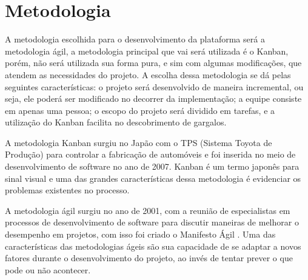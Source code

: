 \chapter[Metodologia]{Metodologia}
A metodologia escolhida para o desenvolvimento da plataforma será a metodologia ágil, a metodologia principal que vai será utilizada é o Kanban, porém, não será utilizada sua forma pura, e sim com algumas modificações, que atendem as necessidades do projeto. A escolha dessa metodologia se dá pelas seguintes características: o projeto será desenvolvido de maneira incremental, ou seja, ele poderá ser modificado no decorrer da implementação; a equipe consiste em apenas uma pessoa; o escopo do projeto será dividido em tarefas, e a utilização do Kanban facilita no descobrimento de gargalos.

A metodologia Kanban surgiu no Japão com o TPS (Sistema Toyota de Produção) \cite{tps} para controlar a fabricação de automóveis e foi inserida no meio de desenvolvimento de software no ano de 2007. Kanban é um termo japonês para sinal visual e uma das grandes características dessa metodologia é evidenciar os problemas existentes no processo. 

A metodologia ágil surgiu no ano de 2001, com a reunião de especialistas em processos de desenvolvimento de software para discutir maneiras de melhorar o desempenho em projetos, com isso foi criado o Manifesto Ágil \cite{agil}. Uma das características das metodologias ágeis são sua capacidade de se adaptar a novos fatores durante o desenvolvimento do projeto, ao invés de tentar prever o que pode ou não acontecer.

